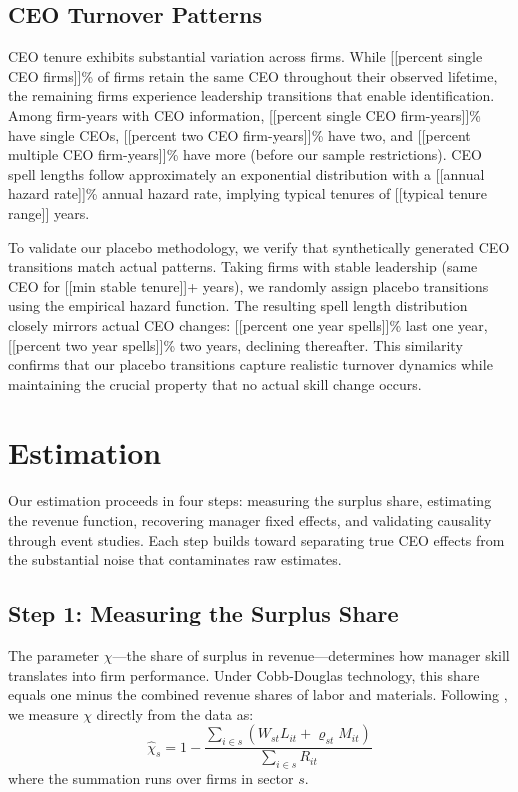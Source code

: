 \documentclass[11pt,a4paper]{article}
\begin{document}
\subsection{CEO Turnover Patterns}

CEO tenure exhibits substantial variation across firms. While [[percent single CEO firms]]\% of firms retain the same CEO throughout their observed lifetime, the remaining firms experience leadership transitions that enable identification. Among firm-years with CEO information, [[percent single CEO firm-years]]\% have single CEOs, [[percent two CEO firm-years]]\% have two, and [[percent multiple CEO firm-years]]\% have more (before our sample restrictions). CEO spell lengths follow approximately an exponential distribution with a [[annual hazard rate]]\% annual hazard rate, implying typical tenures of [[typical tenure range]] years.

To validate our placebo methodology, we verify that synthetically generated CEO transitions match actual patterns. Taking firms with stable leadership (same CEO for [[min stable tenure]]+ years), we randomly assign placebo transitions using the empirical hazard function. The resulting spell length distribution closely mirrors actual CEO changes: [[percent one year spells]]\% last one year, [[percent two year spells]]\% two years, declining thereafter. This similarity confirms that our placebo transitions capture realistic turnover dynamics while maintaining the crucial property that no actual skill change occurs.

\section{Estimation}

Our estimation proceeds in four steps: measuring the surplus share, estimating the revenue function, recovering manager fixed effects, and validating causality through event studies. Each step builds toward separating true CEO effects from the substantial noise that contaminates raw estimates.

\subsection{Step 1: Measuring the Surplus Share}

The parameter $\chi$—the share of surplus in revenue—determines how manager skill translates into firm performance. Under Cobb-Douglas technology, this share equals one minus the combined revenue shares of labor and materials. Following \citet{Gandhi2020-nu}, we measure $\chi$ directly from the data as:
\begin{equation}
\hat{\chi}_s = 1 - \frac{\sum_{i \in s}(W_{st}L_{it} + \varrho_{st}M_{it})}{\sum_{i \in s} R_{it}}
\end{equation}
where the summation runs over firms in sector $s$.
\end{document}
